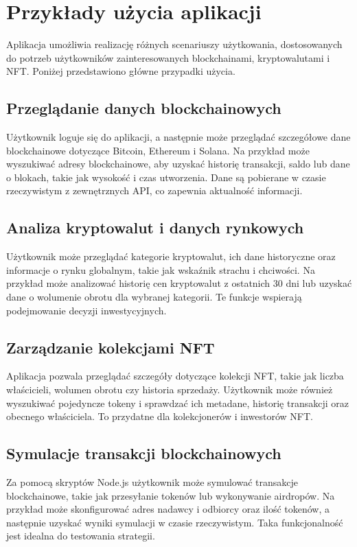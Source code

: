 \section{Przykłady użycia aplikacji}

Aplikacja umożliwia realizację różnych scenariuszy użytkowania, dostosowanych do potrzeb użytkowników zainteresowanych blockchainami, kryptowalutami i NFT. Poniżej przedstawiono główne przypadki użycia.

\subsection{Przeglądanie danych blockchainowych}
Użytkownik loguje się do aplikacji, a następnie może przeglądać szczegółowe dane blockchainowe dotyczące Bitcoin, Ethereum i Solana. Na przykład może wyszukiwać adresy blockchainowe, aby uzyskać historię transakcji, saldo lub dane o blokach, takie jak wysokość i czas utworzenia. Dane są pobierane w czasie rzeczywistym z zewnętrznych API, co zapewnia aktualność informacji.

\subsection{Analiza kryptowalut i danych rynkowych}
Użytkownik może przeglądać kategorie kryptowalut, ich dane historyczne oraz informacje o rynku globalnym, takie jak wskaźnik strachu i chciwości. Na przykład może analizować historię cen kryptowalut z ostatnich 30 dni lub uzyskać dane o wolumenie obrotu dla wybranej kategorii. Te funkcje wspierają podejmowanie decyzji inwestycyjnych.

\subsection{Zarządzanie kolekcjami NFT}
Aplikacja pozwala przeglądać szczegóły dotyczące kolekcji NFT, takie jak liczba właścicieli, wolumen obrotu czy historia sprzedaży. Użytkownik może również wyszukiwać pojedyncze tokeny i sprawdzać ich metadane, historię transakcji oraz obecnego właściciela. To przydatne dla kolekcjonerów i inwestorów NFT.

\subsection{Symulacje transakcji blockchainowych}
Za pomocą skryptów Node.js użytkownik może symulować transakcje blockchainowe, takie jak przesyłanie tokenów lub wykonywanie airdropów. Na przykład może skonfigurować adres nadawcy i odbiorcy oraz ilość tokenów, a następnie uzyskać wyniki symulacji w czasie rzeczywistym. Taka funkcjonalność jest idealna do testowania strategii.

